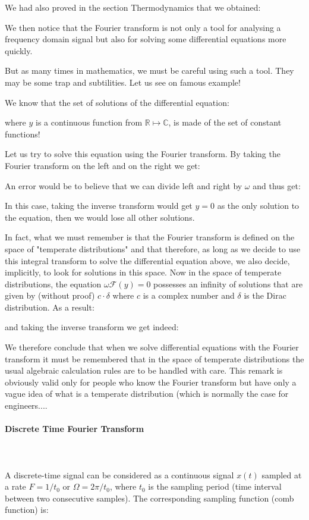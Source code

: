 	We had also proved in the section Thermodynamics that we obtained:
	
	We then notice that the Fourier transform is not only a tool for analysing a frequency domain signal but also for solving some differential equations more quickly.
	
	But as many times in mathematics, we must be careful using such a tool. They may be some trap and subtilities. Let us see on famous example!

	We know that the set of solutions of the differential equation:
	
	where $y$ is a continuous function from $\mathbb{R} \mapsto \mathbb{C}$, is made of the set of constant functions!
	
	Let us try to solve this equation using the Fourier transform. By taking the Fourier transform on the left and on the right we get:
	
	An error would be to believe that we can divide left and right by $\omega $ and thus get:
	
	In this case, taking the inverse transform would get $ y = 0 $ as the only solution to the equation, then we would lose all other solutions.
	
	In fact, what we must remember is that the Fourier transform is defined on the space of "temperate distributions" and that therefore, as long as we decide to use this integral transform to solve the differential equation above, we also decide, implicitly, to look for solutions in this space. Now in the space of temperate distributions, the equation $\omega\mathcal{F}(y)=0$ possesses an infinity of solutions that are given by (without proof) $c\cdot \delta$ where $c$ is a complex number and $\delta$ is the Dirac distribution. As a result:
	
	and taking the inverse transform we get indeed:
	
	We therefore conclude that when we solve differential equations with the Fourier transform it must be remembered that in the space of temperate distributions the usual algebraic calculation rules are to be handled with care. This remark is obviously valid only for people who know the Fourier transform but have only a vague idea of what is a temperate distribution (which is normally the case for engineers....
			
	\paragraph{Discrete Time Fourier Transform}\mbox{}\\\\
	A discrete-time signal can be considered as a continuous signal $x(t)$ 
	sampled at a rate $F=1/t_0$ or $\Omega=2\pi/t_0$, where $t_0$ is the 
	sampling period (time interval between two consecutive samples). The
	corresponding sampling function (comb function) is:
	
